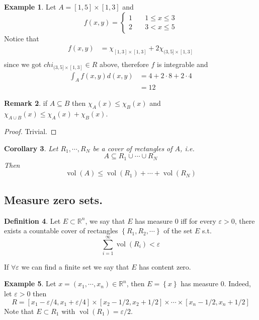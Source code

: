 \documentclass[11pt,a4paper]{article}
\theoremstyle{definition}
\newtheorem{definition}{Definition}[section]
\newtheorem{example}[definition]{Example}
\newtheorem{remark}[definition]{Remark}
\theoremstyle{plain}
\newtheorem{corollary}[definition]{Corollary}
\theoremstyle{remark}
\newcommand{\R}{\mathbb{R}}
\renewcommand{\set}[1]{\left\{ #1 \right\}}
\newcommand{\vol}{\operatorname{vol}}
\begin{document}
\begin{example}
    Let $A = [1,5] \times [1,3]$ and 
    $$f(x,y) = \begin{cases}
        1 \quad & 1 \le x \le 3 \\
        2 \quad & 3 < x \le 5
    \end{cases}$$
    Notice that
    \begin{align*}
        f(x,y) &= \chi_{[1,3] \times [1,3]} + 2 \chi_{(3,5] \times [1,3]} \\
    \end{align*}
    since we got $chi_{(3,5] \times [1,3]} \in R$ above, therefore $f$ is integrable and 
    \begin{align*}
        \int_A f(x,y) d(x,y) &= 4 + 2 \cdot 8 + 2 \cdot 4 \\
        &= 12
    \end{align*}
\end{example}

\begin{remark}
    if $A \subseteq B$ then $\chi_A(x) \le \chi_B(x)$ and $\chi_{A \cup B} (x) \le \chi_A (x) + \chi_B(x)$.
\end{remark}

\begin{proof}
    Trivial.
\end{proof}

\begin{corollary}
    Let $R_1, \cdots, R_N$ be a cover of rectangles of $A$, i.e. 
    $$A \subseteq R_1 \cup \cdots \cup R_N$$
    Then 
    $$\vol(A) \le \vol(R_1) + \cdots + \vol (R_N)$$
\end{corollary}

\subsection{Measure zero sets.} 
\begin{definition}
    Let $E \subset \R^n$, we say that $E$ has measure $0$ iff for every $\varepsilon > 0$, there exists a 
    countable cover of rectangles $\set{R_1, R_2, \cdots}$ of the set $E$ s.t. 
    $$\sum_{i=1}^\infty \vol(R_i) < \varepsilon$$

    If $\forall \varepsilon$ we can find a finite set we say that $E$ has content zero.
\end{definition}

\begin{example}
    Let $x = (x_1, \cdots, x_n)\in \R^n$, then $E = \set{x}$ has measure $0$. 
    Indeed, let $\varepsilon > 0$ then 
    $$R = [x_1 - \varepsilon/4, x_1 + \varepsilon/4] \times [x_2 - 1/2, x_2 + 1/2] \times \cdots \times [x_n-1/2, x_n + 1/2]$$
    Note that $E \subset R_1$ with $\vol (R_1) = \varepsilon/2$. 
\end{example}
\end{document}
